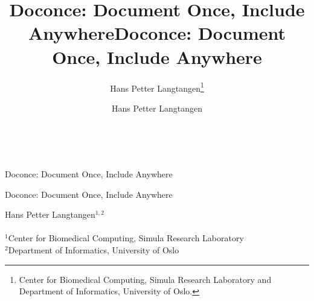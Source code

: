 \documentclass[%
oneside,                 %
final,                   %
10pt]{article}
\begin{document}







\title{Doconce: Document Once, Include Anywhere}


\thispagestyle{empty}
\hbox{\ \ }
\vfill
\begin{center}
{\huge{\bfseries{
\begin{spacing}{1.25}
Doconce: Document Once, Include Anywhere
\end{spacing}
}}}


\title*{Doconce: Document Once, Include Anywhere}


\begin{center}
{\LARGE\bf
\begin{spacing}{1.25}
Doconce: Document Once, Include Anywhere
\end{spacing}
}
\end{center}


\author{Hans Petter Langtangen\footnote{Center for Biomedical Computing, Simula Research Laboratory and Department of Informatics, University of Oslo.}}

\vspace{1.3cm}

    {\Large\textsf{Hans Petter Langtangen${}^{1, 2}$}}\\ [3mm]
    
\ \\ [2mm]

{\large\textsf{${}^1$Center for Biomedical Computing, Simula Research Laboratory} \\ [1.5mm]}
{\large\textsf{${}^2$Department of Informatics, University of Oslo} \\ [1.5mm]}

\author{Hans Petter Langtangen}


\end{center}
\end{document}
